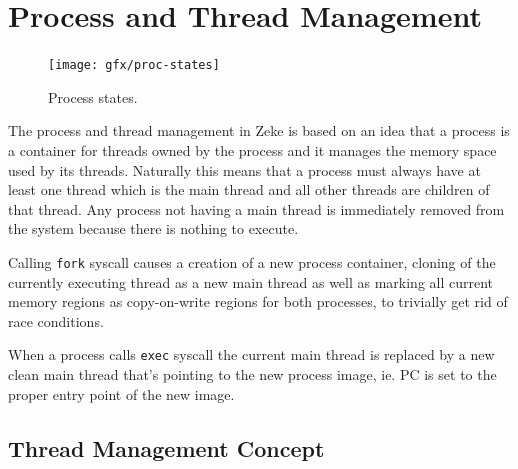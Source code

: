 \part{Process and Thread Management}

\begin{figure}
  \center
  \texttt{[image: gfx/proc-states]}
  \caption{Process states.}
  \label{figure:procstates}
\end{figure}

The process and thread management in Zeke is based on an idea
that a process is a container for threads owned by the process
and it manages the memory space used by its threads. Naturally
this means that a process must always have at least one thread
which is the main thread and all other threads are children of
that thread. Any process not having a main thread is immediately
removed from the system because there is nothing to execute.

Calling \verb+fork+ syscall causes a creation of a new process
container, cloning of the currently executing thread as a new
main thread as well as marking all current memory regions as
copy-on-write regions for both processes, to trivially get rid
of race conditions.

When a process calls \verb+exec+ syscall the current main thread
is replaced by a new clean main thread that's pointing to the
new process image, ie. \acs{PC} is set to the proper entry point of
the new image.

\chapter{Thread Management Concept}

